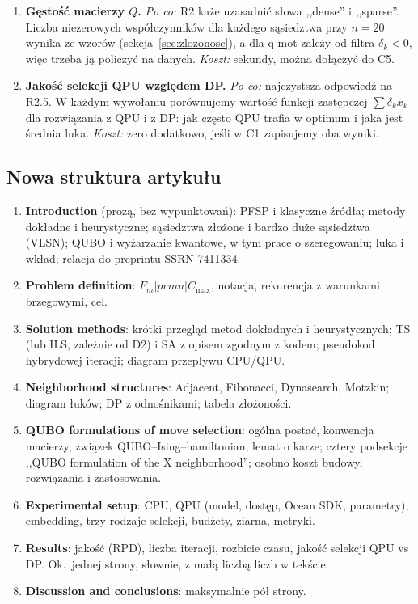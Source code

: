 \documentclass[11pt,a4paper]{article}
\newcommand{\Cmax}{C_{\max}}
\begin{document}
\begin{enumerate}[label=\textbf{C\arabic*.},leftmargin=2.2em]
\item \textbf{Gęstość macierzy $Q$.} \emph{Po co:} R2 każe uzasadnić słowa ,,dense'' i ,,sparse''. Liczba niezerowych współczynników dla każdego sąsiedztwa przy $n=20$ wynika ze wzorów (sekcja~\ref{sec:zlozonosc}), a dla q-mot zależy od filtra $\delta_k<0$, więc trzeba ją policzyć na danych. \emph{Koszt:} sekundy, można dołączyć do C5.
\item \textbf{Jakość selekcji QPU względem DP.} \emph{Po co:} najczystsza odpowiedź na R2.5. W każdym wywołaniu porównujemy wartość funkcji zastępczej $\sum\delta_k x_k$ dla rozwiązania z QPU i z DP: jak często QPU trafia w optimum i jaka jest średnia luka. \emph{Koszt:} zero dodatkowo, jeśli w C1 zapisujemy oba wyniki.
\end{enumerate}

\subsection{Nowa struktura artykułu}\label{sec:struktura}

\begin{enumerate}[leftmargin=2em]
\item \textbf{Introduction} (prozą, bez wypunktowań): PFSP i klasyczne źródła; metody dokładne i heurystyczne; sąsiedztwa złożone i bardzo duże sąsiedztwa (VLSN); QUBO i wyżarzanie kwantowe, w tym prace o szeregowaniu; luka i wkład; relacja do preprintu SSRN 7411334.
\item \textbf{Problem definition}: $F_m|prmu|\Cmax$, notacja, rekurencja z warunkami brzegowymi, cel.
\item \textbf{Solution methods}: krótki przegląd metod dokładnych i heurystycznych; TS (lub ILS, zależnie od D2) i SA z opisem zgodnym z kodem; pseudokod hybrydowej iteracji; diagram przepływu CPU/QPU.
\item \textbf{Neighborhood structures}: Adjacent, Fibonacci, Dynasearch, Motzkin; diagram łuków; DP z odnośnikami; tabela złożoności.
\item \textbf{QUBO formulations of move selection}: ogólna postać, konwencja macierzy, związek QUBO--Ising--hamiltonian, lemat o karze; cztery podsekcje ,,QUBO formulation of the X neighborhood''; osobno koszt budowy, rozwiązania i zastosowania.
\item \textbf{Experimental setup}: CPU, QPU (model, dostęp, Ocean SDK, parametry), embedding, trzy rodzaje selekcji, budżety, ziarna, metryki.
\item \textbf{Results}: jakość (RPD), liczba iteracji, rozbicie czasu, jakość selekcji QPU vs DP. Ok.\ jednej strony, słownie, z małą liczbą liczb w tekście.
\item \textbf{Discussion and conclusions}: maksymalnie pół strony.
\end{enumerate}
\end{document}
